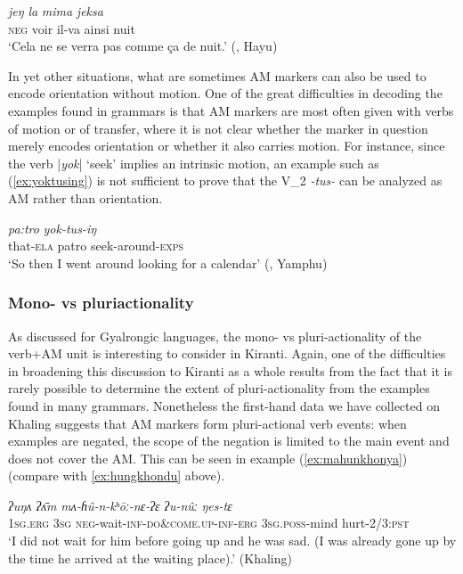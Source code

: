 \documentclass[oneside,a4paper,11pt]{article}
\newcommand{\ipa}[1]{{\phon\textit{#1}}}
\newcommand{\sens}[1]{‘#1’}
\newcommand{\rouge}[1]{{\color{red}#1}}
\newcommand{\dhatu}[2]{|\ipa{#1}| `#2'}
\begin{document}
\begin{exe}
\ex \label{ex:jeŋ.la}
 \gll \ipa{ma}	\ipa{jeŋ}	\ipa{la}	\ipa{mima}	\ipa{jeksa} \\
\textsc{neg} voir il-va ainsi nuit \\
\glt \sens{Cela ne se verra pas comme ça de nuit.} (\citealt[153]{michailovsky88}, Hayu)
\end{exe}

In yet other situations, what are sometimes AM markers can also be used to encode orientation without motion.  One of the great difficulties in decoding the examples found in grammars is that AM markers are most often given with verbs of motion or of transfer, where it is not clear whether the marker in question merely encodes orientation or whether it also carries motion. For instance, since the verb \dhatu{yok}{seek} implies an intrinsic motion, an example such as (\ref{ex:yoktusing}) is not sufficient to prove that the V_2 \ipa{-tus-} can be analyzed as AM rather than orientation.
 
\begin{exe}
\ex \label{ex:yoktusing}
 \gll  \ipa{mo-ba}	\ipa{pa:tro}	\ipa{yok-tus-iŋ} \\
that-\textsc{ela} patro seek-around-\textsc{exps} \\
\glt \sens{So then I went around looking for a calendar} (\citealt[153]{rutgers98yamphu}, Yamphu)
\end{exe}


  
\subsubsection{Mono- vs pluriactionality} \label{sec:khaling.pluriactionality}

As discussed for Gyalrongic languages, the mono- vs pluri-actionality of the verb+AM unit is interesting to consider in Kiranti.  Again, one of the difficulties in broadening this discussion to Kiranti as a whole results from the fact that it is rarely possible to determine the extent of pluri-actionality from the examples found in many grammars.  Nonetheless the first-hand data we have collected on Khaling suggests that AM markers form pluri-actional verb events: when examples are negated, the scope of the negation is limited to the main event and does not cover the AM. This can be seen in example (\ref{ex:mahunkhonya}) (compare with \ref{ex:hungkhondu} above). 

\begin{exe}
\ex \label{ex:mahunkhonya}
 \gll
\ipa{ʔuŋʌ} \ipa{ʔʌ̄m} \ipa{mʌ-ɦû-n-\rouge{kʰōː}-nɛ-ʔɛ} \ipa{ʔu-nûː} \ipa{ŋes-tɛ} \\
\textsc{1sg}.\textsc{erg} \textsc{3sg} \textsc{neg}-wait-\textsc{inf}-\rouge{\textsc{do\&come.up}}-\textsc{inf}-\textsc{erg} \textsc{3sg}.\textsc{poss}-mind hurt-2/3:\textsc{pst} \\
\glt `I did not wait for him before going up and he was sad. (I was already gone up by the time he arrived at the waiting place).'  (Khaling)
\end{exe}
\end{document}
